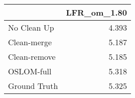 \begin{tabular}{lr}
\toprule
{} & LFR_om_1.80 \\
\midrule
No Clean Up  &       4.393 \\
Clean-merge  &       5.187 \\
Clean-remove &       5.185 \\
OSLOM-full   &       5.318 \\
Ground Truth &       5.325 \\
\bottomrule
\end{tabular}
